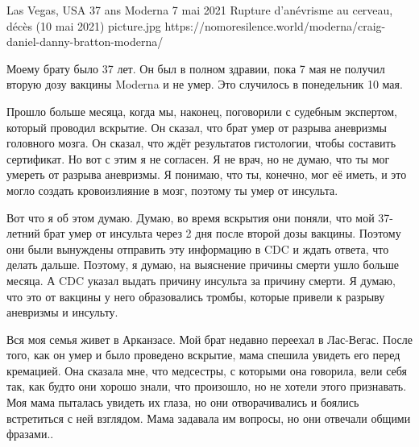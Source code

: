           {Las Vegas, USA}
          {37 ans}
          {Moderna}
          {7 mai 2021}
          {Rupture d'anévrisme au cerveau, décès (10 mai 2021)}
          {picture.jpg}
          {https://nomoresilence.world/moderna/craig-daniel-danny-bratton-moderna/}
          {
            
Моему брату было 37 лет. Он был в полном здравии, пока 7 мая не получил вторую
дозу вакцины Moderna и не умер. Это случилось в понедельник 10 мая.

Прошло больше месяца, когда мы, наконец, поговорили с судебным экспертом,
который проводил вскрытие. Он сказал, что брат умер от разрыва аневризмы
головного мозга. Он сказал, что ждёт результатов гистологии, чтобы составить
сертификат. Но вот с этим я не согласен. Я не врач, но не думаю, что ты мог
умереть от разрыва аневризмы. Я понимаю, что ты, конечно, мог её иметь, и это
могло создать кровоизлияние в мозг, поэтому ты умер от инсульта.

Вот что я об этом думаю. Думаю, во время вскрытия они поняли, что мой 37-летний
брат умер от инсульта через 2 дня после второй дозы вакцины. Поэтому они были
вынуждены отправить эту информацию в CDC и ждать ответа, что делать
дальше. Поэтому, я думаю, на выяснение причины смерти ушло больше месяца. А CDC
указал выдать причину инсульта за причину смерти. Я думаю, что это от вакцины у
него образовались тромбы, которые привели к разрыву аневризмы и инсульту.

Вся моя семья живет в Арканзасе. Мой брат недавно переехал в Лас-Вегас. После
того, как он умер и было проведено вскрытие, мама спешила увидеть его перед
кремацией. Она сказала мне, что медсестры, с которыми она говорила, вели себя
так, как будто они хорошо знали, что произошло, но не хотели этого
признавать. Моя мама пыталась увидеть их глаза, но они отворачивались и боялись
встретиться с ней взглядом. Мама задавала им вопросы, но они отвечали общими
фразами..

}
